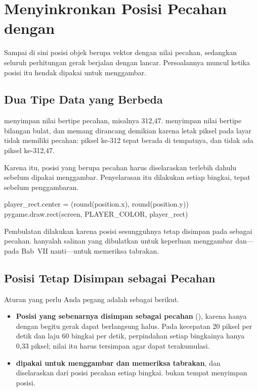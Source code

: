 \section{Menyinkronkan Posisi Pecahan dengan }
\label{sec:selaras-rect}

Sampai di sini posisi objek berupa vektor dengan nilai pecahan, sedangkan
seluruh perhitungan gerak berjalan dengan lancar. Persoalannya muncul ketika
posisi itu hendak dipakai untuk menggambar.

\subsection{Dua Tipe Data yang Berbeda}

 menyimpan nilai bertipe pecahan, misalnya 312,47.
 menyimpan nilai bertipe bilangan bulat, dan memang
dirancang demikian karena letak piksel pada layar tidak memiliki pecahan:
piksel ke-312 tepat berada di tempatnya, dan tidak ada piksel ke-312,47.

Karena itu, posisi yang berupa pecahan harus diselaraskan terlebih dahulu
sebelum dipakai menggambar. Penyelarasan itu dilakukan setiap bingkai, tepat
sebelum penggambaran.

\begin{kodekeluaran}
player_rect.center = (round(position.x), round(position.y))
pygame.draw.rect(screen, PLAYER_COLOR, player_rect)
\end{kodekeluaran}

Pembulatan dilakukan karena posisi sesungguhnya tetap disimpan pada
 sebagai pecahan.  hanyalah salinan yang
dibulatkan untuk keperluan menggambar dan---pada Bab~VII nanti---untuk
memeriksa tabrakan.

\subsection{Posisi Tetap Disimpan sebagai Pecahan}

Aturan yang perlu Anda pegang adalah sebagai berikut.

\begin{itemize}
  \item \textbf{Posisi yang sebenarnya disimpan sebagai pecahan}
        (), karena hanya dengan begitu gerak dapat berlangsung
        halus. Pada kecepatan 20 piksel per detik dan laju 60 bingkai per
        detik, perpindahan setiap bingkainya hanya 0,33 piksel; nilai itu harus
        tersimpan agar dapat terakumulasi.
  \item \textbf{ dipakai untuk menggambar dan memeriksa tabrakan},
        dan diselaraskan dari posisi pecahan setiap bingkai.  bukan
        tempat menyimpan posisi.
\end{itemize}

